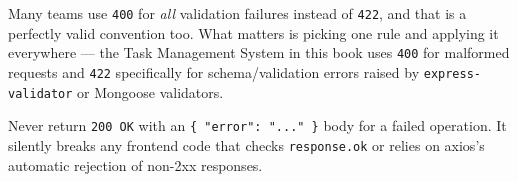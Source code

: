 \begin{notebox}[NOTE]
Many teams use \texttt{400} for \emph{all} validation failures instead of
\texttt{422}, and that is a perfectly valid convention too. What matters is
picking one rule and applying it everywhere --- the Task Management System
in this book uses \texttt{400} for malformed requests and \texttt{422}
specifically for schema/validation errors raised by \texttt{express-validator}
or Mongoose validators.
\end{notebox}

\begin{warnbox}[WARNING]
Never return \texttt{200 OK} with an \texttt{\{ "error": "..." \}} body for a
failed operation. It silently breaks any frontend code that checks
\texttt{response.ok} or relies on axios's automatic rejection of non-2xx
responses.
\end{warnbox}
